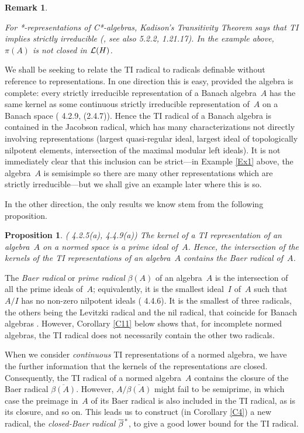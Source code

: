 \documentclass[11pt]{article}
\newcommand{\closure}[1]{\overline{#1}}
\newcommand{\bt}{\beta}
\newtheorem{prop}[thm]{Proposition}
\newtheorem{remk}[thm]{Remark}
\newenvironment{Remark}{\begin{remk}\begin{rm}}{\end{rm}\end{remk}}
\newcommand{\barstar}[1]{{\closure{#1}\kern 1pt}^*}
\newcommand{\LH}{{\cal L}(H)}
\begin{document}
\begin{Remark}
For *-representations of C*-algebras,
Kadison's Transitivity Theorem says that TI implies strictly irreducible
(\cite{Kadison}, see also \cite{Murphy} 5.2.2, \cite{Sakai} 1.21.17).  In
the example above, $\pi(A)$ is not closed in $\LH$.
\end{Remark}

We shall be seeking to relate the TI radical to radicals definable without
reference to representations.    In one direction this is easy, provided the
algebra is complete:  every strictly irreducible representation of a Banach algebra~$A$ has the
same kernel as some continuous strictly irreducible representation of~$A$ on a Banach
space (\cite{Palmerbk} 4.2.9, \cite{Rickart} (2.4.7)).    Hence the TI radical
of a Banach algebra is contained in the Jacobson radical, which has many
characterizations not directly involving representations (largest quasi-regular
ideal, largest ideal of topologically nilpotent elements, intersection of the
maximal modular left ideals).   It is not immediately clear
that this inclusion can be strict---in Example \ref{Ex1} above, the algebra~$A$
is semisimple so there are many other representations which are strictly
irreducible---but we shall give an example later where this is so.

In the other direction, the only results we know stem from the following
proposition.

\begin{prop}\label{P1} {\rm (\cite{Palmerbk} 4.2.5(a), 4.4.9(a))}
The kernel of a TI representation of an algebra~$A$ on a normed space is a prime
ideal of~$A$.   Hence, the intersection of the kernels of the TI representations of an algebra~$A$
contains the Baer radical of~$A$.
\end{prop}

The {\em Baer radical} or {\em prime radical} $\bt(A)$ of an algebra~$A$
is the intersection of all the prime ideals of~$A$; equivalently, it is the
smallest ideal~$I$ of~$A$ such that $A/I$ has no non-zero nilpotent ideals
(\cite{Palmerbk} 4.4.6).  It is the smallest of three radicals, the others being
the Levitzki radical and the nil radical, that coincide for Banach algebras
\cite{PGD7}.   However, Corollary \ref{C11} below shows that, for incomplete
normed algebras, the TI radical does not necessarily contain the other two
radicals.

When we consider {\em continuous} TI representations of a normed algebra,
we have the further information that the kernels of the representations are
closed.    Consequently, the TI radical of a normed algebra~$A$ contains the
closure of the Baer radical $\overline{\bt(A)}$.   However,
$A/\overline{\bt(A)}$ might fail to be semiprime, in which case the preimage
in~$A$ of its Baer radical is also included in the TI radical, as is its
closure, and so on.  This leads us to construct (in Corollary \ref{C4}) a new
radical, the {\em closed-Baer radical} $\barstar{\beta}$, to give a good lower
bound for the TI radical.
\end{document}
